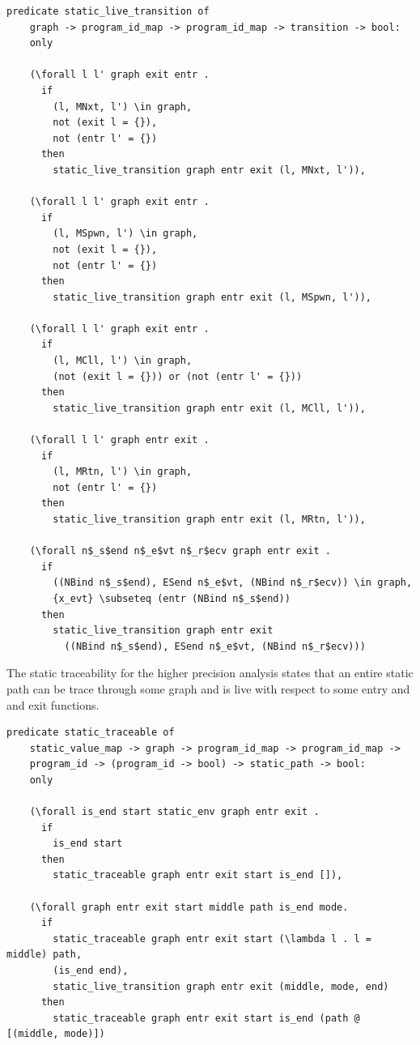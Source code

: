 \documentclass[10pt]{article}
\begin{document}
\begin{lstlisting}[language=logic, mathescape]
  predicate static_live_transition of
    graph -> program_id_map -> program_id_map -> transition -> bool:
    only

    (\forall l l' graph exit entr . 
      if
        (l, MNxt, l') \in graph,
        not (exit l = {}),
        not (entr l' = {})
      then
        static_live_transition graph entr exit (l, MNxt, l')),

    (\forall l l' graph exit entr .
      if
        (l, MSpwn, l') \in graph, 
        not (exit l = {}),
        not (entr l' = {})
      then
        static_live_transition graph entr exit (l, MSpwn, l')),

    (\forall l l' graph exit entr .
      if
        (l, MCll, l') \in graph,
        (not (exit l = {})) or (not (entr l' = {}))
      then
        static_live_transition graph entr exit (l, MCll, l')),

    (\forall l l' graph entr exit .
      if
        (l, MRtn, l') \in graph,
        not (entr l' = {})
      then
        static_live_transition graph entr exit (l, MRtn, l')),

    (\forall n$_s$end n$_e$vt n$_r$ecv graph entr exit .
      if
        ((NBind n$_s$end), ESend n$_e$vt, (NBind n$_r$ecv)) \in graph, 
        {x_evt} \subseteq (entr (NBind n$_s$end))
      then
        static_live_transition graph entr exit
          ((NBind n$_s$end), ESend n$_e$vt, (NBind n$_r$ecv)))
  \end{lstlisting}

The static traceability for the higher precision analysis states
that an entire static path can be trace through some graph and
is live with respect to some entry and and exit functions.

\begin{lstlisting}[language=logic, mathescape]
  predicate static_traceable of
    static_value_map -> graph -> program_id_map -> program_id_map ->
    program_id -> (program_id -> bool) -> static_path -> bool:
    only

    (\forall is_end start static_env graph entr exit .
      if
        is_end start
      then
        static_traceable graph entr exit start is_end []),

    (\forall graph entr exit start middle path is_end mode. 
      if
        static_traceable graph entr exit start (\lambda l . l = middle) path, 
        (is_end end),
        static_live_transition graph entr exit (middle, mode, end) 
      then
        static_traceable graph entr exit start is_end (path @ [(middle, mode)])
  \end{lstlisting}
\end{document}
